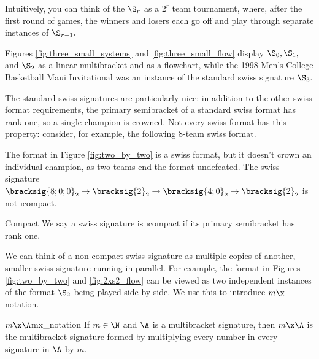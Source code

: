 {    Intuitively, you can think of the $\S_r$ as a $2^r$ team tournament, where, after the first round of games, the winners and losers each go off and play through separate instances of $\S_{r-1}.$

    Figures \ref{fig:three_small_systems} and \ref{fig:three_small_flow} display $\S_0, \S_1,$ and $\S_2$ as a linear multibracket and as a flowchart, while the 1998 Men's College Basketball Maui Invitational was an instance of the standard swiss signature $\S_3.$


    The standard swiss signatures are particularly nice: in addition to the other swiss format requirements, the primary semibracket of a standard swiss format has rank one, so a single champion is crowned. Not every swiss format has this property: consider, for example, the following 8-team swiss format.

    

    The format in Figure \ref{fig:two_by_two} is a swiss format, but it doesn't crown an individual champion, as two teams end the format undefeated. The swiss signature $\bracksig{8;0;0}_2 \to \bracksig{2}_2 \to \bracksig{4;0}_2 \to \bracksig{2}_2$ is not \i{compact}.

   \begin{definition}{Compact}{}
        We say a swiss signature is \i{compact} if its primary semibracket has rank one.
   \end{definition}

    We can think of a non-compact swiss signature as multiple copies of another, smaller swiss signature running in parallel. For example, the format in Figures \ref{fig:two_by_two} and \ref{fig:2xs2_flow} can be viewed as two independent instances of the format $\S_2$ being played side by side. We use this to introduce $m\x$ notation.  %

   \begin{definition}{$m\x\A$}{mx_notation}
        If $m \in \N$ and $\A$ is a multibracket signature, then $m\x\A$ is the multibracket signature formed by multiplying every number in every signature in $\A$ by $m$.
    \end{definition}

}
